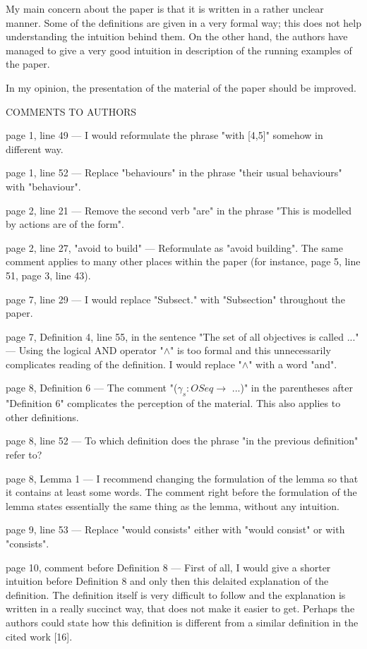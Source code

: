 \documentclass[11pt]{article}
\begin{document}
My main concern about the paper is that it is written in a rather unclear manner. Some of the definitions are given in a very formal way; this does not help understanding the intuition behind them. On the other hand, the authors have managed to give a very good intuition in description of the running examples of the paper.

In my opinion, the presentation of the material of the paper should be improved.

COMMENTS TO AUTHORS

page 1, line 49 ---
I would reformulate the phrase "with [4,5]" somehow in different way.

page 1, line 52 ---
Replace "behaviours" in the phrase "their usual behaviours" with "behaviour".

page 2, line 21 ---
Remove the second verb "are" in the phrase "This is modelled by actions are of the form".

page 2, line 27, "avoid to build" ---
Reformulate as "avoid building".
The same comment applies to many other places within the paper (for instance, page 5, line 51, page 3, line 43).

page 7, line 29 ---
I would replace "Subsect." with "Subsection" throughout the paper.

page 7, Definition 4, line 55, in the sentence "The set of all objectives is called ..." ---
Using the logical AND operator "$\land$" is too formal and this unnecessarily complicates reading of the definition.
I would replace "$\land$" with a word "and".

page 8, Definition 6 ---
The comment "($\gamma_s: OSeq \to$ ...)" in the parentheses after "Definition 6" complicates the perception of the material. This also applies to other definitions.

page 8, line 52 ---
To which definition does the phrase "in the previous definition" refer to?

page 8, Lemma 1 ---
I recommend changing the formulation of the lemma so that it contains at least some words.
The comment right before the formulation of the lemma states essentially the same thing as the lemma, without any intuition.

page 9, line 53 ---
Replace "would consists" either with "would consist" or with "consists".

page 10, comment before Definition 8 ---
First of all, I would give a shorter intuition before Definition 8 and only then this delaited explanation of the definition. The definition itself is very difficult to follow and the explanation is written in a really succinct way, that does not make it easier to get. Perhaps the authors could state how this definition is different from a similar definition in the cited work [16].
\end{document}
